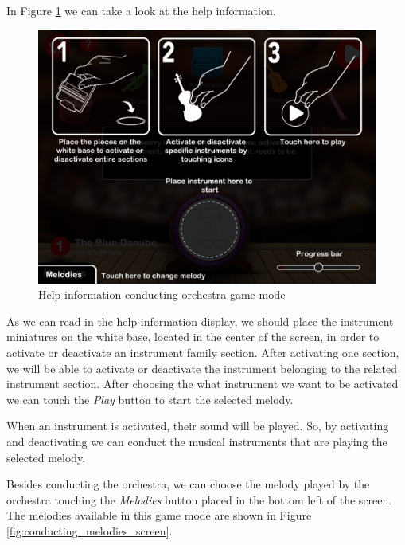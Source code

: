 In Figure \ref{fig:help_conducting_screen} we can take a look at the help information.

\begin{figure}[ht!]
	\centering
	\includegraphics[width=400pt]{graphics/use-case/help_conducting_screen.jpg}
	\caption{Help information conducting orchestra game mode}
	\label{fig:help_conducting_screen}
\end{figure}

\FloatBarrier

As we can read in the help information display, we should place the instrument miniatures on the white base, located in the center of the screen, in order to activate or deactivate an instrument family section. After activating one section, we will be able to activate or deactivate the instrument belonging to the related instrument section. After choosing the what instrument we want to be activated we can touch the \textit{Play} button to start the selected melody.

When an instrument is activated, their sound will be played. So, by activating and deactivating we can conduct the musical instruments that are playing the selected melody. 

Besides conducting the orchestra, we can choose the melody played by the orchestra touching the \textit{Melodies} button placed in the bottom left of the screen. The melodies available in this game mode are shown in Figure \ref{fig:conducting_melodies_screen}.

